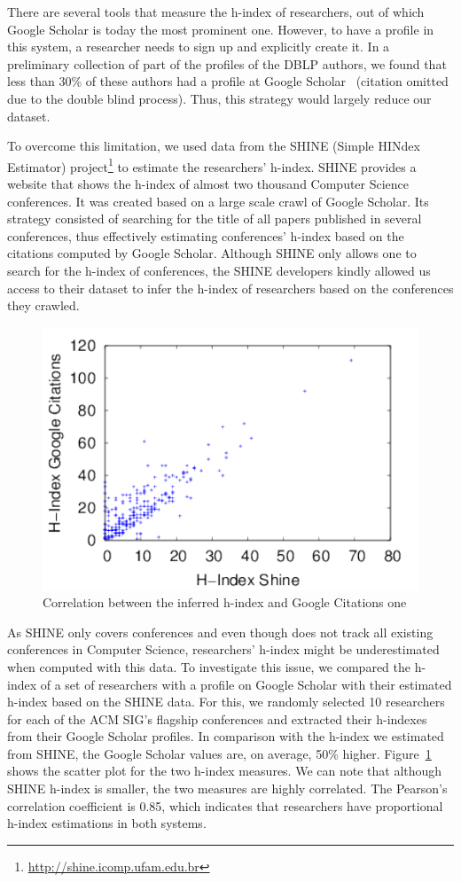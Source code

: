 \documentclass[letterpaper]{article}
\begin{document}
There are several tools that measure the h-index of researchers, out of which Google Scholar is today the most prominent one. However, to have a profile in this system, a researcher needs to sign up and explicitly create it. In a preliminary collection of part of the profiles of the DBLP authors, we found that less than 30\% of these authors had a profile at Google Scholar%
~(citation omitted due to the double blind process). Thus, this strategy would largely reduce our dataset.

To overcome this limitation, we used data from the SHINE (Simple HINdex Estimator) project\footnote{\url{http://shine.icomp.ufam.edu.br}} to estimate the researchers' h-index. SHINE provides a website that shows the h-index of almost two thousand Computer Science conferences. It was created based on a large scale crawl of Google Scholar. Its strategy consisted of searching for the title of all papers published in several conferences, thus effectively estimating conferences’ h-index based on the citations computed by Google Scholar. Although SHINE only allows one to search for the h-index of conferences, the SHINE developers kindly allowed us access to their dataset to infer the h-index of researchers based on the conferences they crawled.


\begin{figure}[!htb]
\centering
 \includegraphics[width=.46\textwidth]{figures/hindex_scatter_plot.pdf}
\caption{Correlation between the inferred h-index and Google Citations one}
\label{fig:hindex_scatter_plot}
\end{figure}

As SHINE only covers conferences and even though does not track all existing conferences in Computer Science, researchers' h-index might be underestimated when computed with this data. To investigate this issue, we compared the h-index of a set of researchers with a profile on Google Scholar with their estimated h-index based on the SHINE data. For this, we randomly selected 10 researchers for each of the ACM SIG's flagship conferences and extracted their h-indexes from their Google Scholar profiles. In comparison with the h-index we estimated from SHINE, the Google Scholar values are, on average, 50\% higher. 
Figure~\ref{fig:hindex_scatter_plot} shows the scatter plot for the two h-index measures. We can note that although SHINE h-index is smaller, the two measures are highly correlated. The Pearson's correlation coefficient is 0.85, which indicates that researchers have proportional h-index estimations in both systems.
\end{document}
